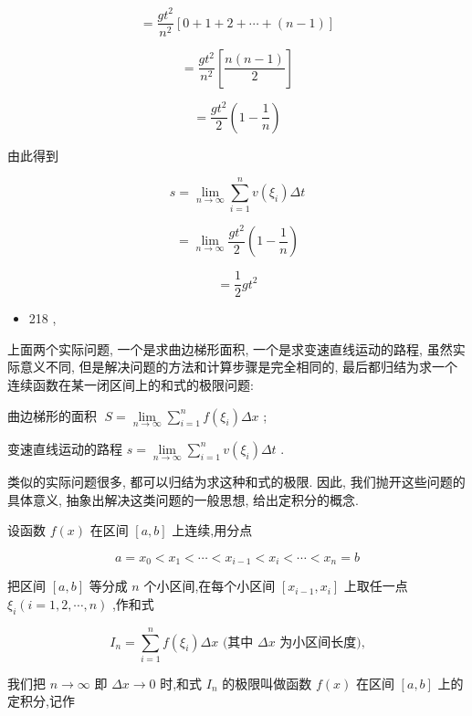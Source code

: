 \documentclass[lang=cn,newtx,10pt,scheme=chinese]{elegantbook}
\begin{document}
\[
= \frac{g{t}^{2}}{{n}^{2}}\left\lbrack {0 + 1 + 2 + \cdots + \left( {n - 1}\right) }\right\rbrack
\]

\[
= \frac{g{t}^{2}}{{n}^{2}}\left\lbrack \frac{n\left( {n - 1}\right) }{2}\right\rbrack
\]

\[
= \frac{g{t}^{2}}{2}\left( {1 - \frac{1}{n}}\right)
\]

由此得到

\[
s = \mathop{\lim }\limits_{{n \rightarrow \infty }}\mathop{\sum }\limits_{{i = 1}}^{n}v\left( {\xi }_{i}\right) {\Delta t}
\]

\[
= \mathop{\lim }\limits_{{n \rightarrow \infty }}\frac{g{t}^{2}}{2}\left( {1 - \frac{1}{n}}\right)
\]

\[
= \frac{1}{2}g{t}^{2}
\]

\begin{itemize}
\item 218 ,
\end{itemize}

上面两个实际问题, 一个是求曲边梯形面积, 一个是求变速直线运动的路程, 虽然实际意义不同, 但是解决问题的方法和计算步骤是完全相同的, 最后都归结为求一个连续函数在某一闭区间上的和式的极限问题:

曲边梯形的面积 \(\;S = \mathop{\lim }\limits_{{n \rightarrow \infty }}\mathop{\sum }\limits_{{i = 1}}^{n}f\left( {\xi }_{i}\right) {\Delta x}\) ;

变速直线运动的路程 \(s = \mathop{\lim }\limits_{{n \rightarrow \infty }}\mathop{\sum }\limits_{{i = 1}}^{n}v\left( {\xi }_{i}\right) {\Delta t}\) .

类似的实际问题很多, 都可以归结为求这种和式的极限. 因此, 我们抛开这些问题的具体意义, 抽象出解决这类问题的一般思想, 给出定积分的概念.

设函数 \(f\left( x\right)\) 在区间 \(\left\lbrack {a,b}\right\rbrack\) 上连续,用分点

\[
a = {x}_{0} < {x}_{1} < \cdots < {x}_{i - 1} < {x}_{i} < \cdots < {x}_{n} = b
\]

把区间 \(\left\lbrack {a,b}\right\rbrack\) 等分成 \(n\) 个小区间,在每个小区间 \(\left\lbrack {{x}_{i - 1},{x}_{i}}\right\rbrack\) 上取任一点 \({\xi }_{i}\left( {i = 1,2,\cdots ,n}\right)\) ,作和式

\[
{I}_{n} = \mathop{\sum }\limits_{{i = 1}}^{n}f\left( {\xi }_{i}\right) {\Delta x}\text{ (其中 }{\Delta x}\text{ 为小区间长度),}
\]

我们把 \(n \rightarrow \infty\) 即 \({\Delta x} \rightarrow 0\) 时,和式 \({I}_{n}\) 的极限叫做函数 \(f\left( x\right)\) 在区间 \(\left\lbrack {a,b}\right\rbrack\) 上的定积分,记作
\end{document}
